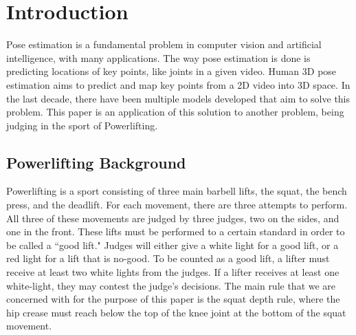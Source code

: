 \section{Introduction}
\label{sec:intro}
Pose estimation is a fundamental problem in computer vision and artificial intelligence, with many applications. The way pose estimation is done is predicting locations of key points, like joints in a given video. Human 3D pose estimation aims to predict and map key points from a 2D video into 3D space. In the last decade, there have been multiple models developed that aim to solve this problem. This paper is an application of this solution to another problem, being judging in the sport of Powerlifting. 
\subsection{Powerlifting Background}
Powerlifting is a sport consisting of three main barbell lifts, the squat, the bench press, and the deadlift. For each movement, there are three attempts to perform. All three of these movements are judged by three judges, two on the sides, and one in the front. These lifts must be performed to a certain standard in order to be called a ``good lift." Judges will either give a white light for a good lift, or a red light for a lift that is no-good. To be counted as a good lift, a lifter must receive at least two white lights from the judges. If a lifter receives at least one white-light, they may contest the judge's decisions. The main rule that we are concerned with for the purpose of this paper is the squat depth rule, where the hip crease must reach below the top of the knee joint at the bottom of the squat movement. 

